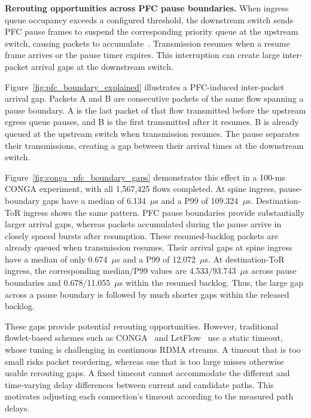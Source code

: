 \documentclass[10pt,journal,compsoc]{IEEEtran}
\begin{document}
\noindent
\textbf{Rerouting opportunities across PFC pause boundaries.}
When ingress queue occupancy exceeds a configured threshold, the downstream switch sends PFC pause frames to suspend the corresponding priority queue at the upstream switch, causing packets to accumulate~\cite{DCQCN}. Transmission resumes when a resume frame arrives or the pause timer expires. This interruption can create large inter-packet arrival gaps at the downstream switch.

Figure~\ref{fig:pfc_boundary_explained} illustrates a PFC-induced inter-packet arrival gap. Packets A and B are consecutive packets of the same flow spanning a pause boundary. A is the last packet of that flow transmitted before the upstream egress queue pauses, and B is the first transmitted after it resumes. B is already queued at the upstream switch when transmission resumes. The pause separates their transmissions, creating a gap between their arrival times at the downstream switch.



Figure~\ref{fig:conga_pfc_boundary_gaps} demonstrates this effect in a 100-ms CONGA experiment, with all 1,567,425 flows completed. At spine ingress, pause-boundary gaps have a median of 6.134~$\mu$s and a P99 of 109.324~$\mu$s. Destination-ToR ingress shows the same pattern. PFC pause boundaries provide substantially larger arrival gaps, whereas packets accumulated during the pause arrive in closely spaced bursts after resumption. These resumed-backlog packets are already queued when transmission resumes. Their arrival gaps at spine ingress have a median of only 0.674~$\mu$s and a P99 of 12.072~$\mu$s. At destination-ToR ingress, the corresponding median/P99 values are 4.533/93.743~$\mu$s across pause boundaries and 0.678/11.055~$\mu$s within the resumed backlog. Thus, the large gap across a pause boundary is followed by much shorter gaps within the released backlog.

These gaps provide potential rerouting opportunities. However, traditional flowlet-based schemes such as CONGA~\cite{Conga} and LetFlow~\cite{Letflow} use a static timeout, whose tuning is challenging in continuous RDMA streams. A timeout that is too small risks packet reordering, whereas one that is too large misses otherwise usable rerouting gaps. A fixed timeout cannot accommodate the different and time-varying delay differences between current and candidate paths. This motivates adjusting each connection's timeout according to the measured path delays.
\end{document}
